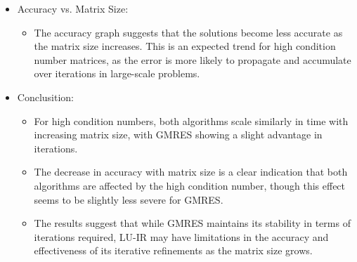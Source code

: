 \begin{enumerate}
\begin{itemize}
\begin{itemize}
\begin{itemize}
            \end{itemize}
           \item Accuracy vs. Matrix Size:
           \begin{itemize}
               \item The accuracy graph suggests that the solutions become less accurate as the matrix size increases. This is an expected trend for high condition number matrices, as the error is more likely to propagate and accumulate over iterations in large-scale problems.
           \end{itemize}
           \item Conclusition:
           \begin{itemize}
               \item For high condition numbers, both algorithms scale similarly in time with increasing matrix size, with GMRES showing a slight advantage in iterations.
                \item The decrease in accuracy with matrix size is a clear indication that both algorithms are affected by the high condition number, though this effect seems to be slightly less severe for GMRES.
            \item The results suggest that while GMRES maintains its stability in terms of iterations required, LU-IR may have limitations in the accuracy and effectiveness of its iterative refinements as the matrix size grows.
           \end{itemize}
        \end{itemize}
    \end{itemize}
    
    
\end{enumerate}
\clearpage
